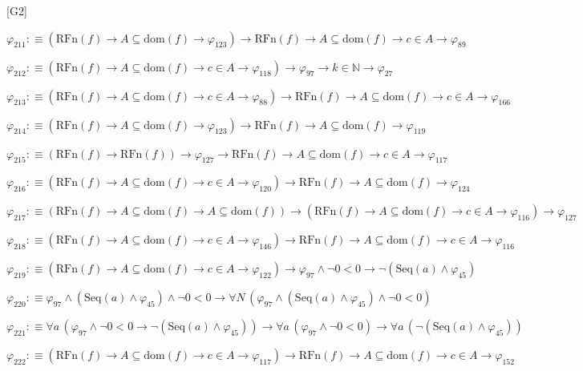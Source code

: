 \begin{fullproof}{[G2]}
\begin{abbrevlist}
\item $\varphi_{211} :\equiv (\mathrm{RFn}(f) \to A \subseteq \mathrm{dom}(f) \to \varphi_{123}) \to \mathrm{RFn}(f) \to A \subseteq \mathrm{dom}(f) \to c \in A \to \varphi_{89}$
\item $\varphi_{212} :\equiv (\mathrm{RFn}(f) \to A \subseteq \mathrm{dom}(f) \to c \in A \to \varphi_{118}) \to \varphi_{97} \to k \in \mathbb{N} \to \varphi_{27}$
\item $\varphi_{213} :\equiv (\mathrm{RFn}(f) \to A \subseteq \mathrm{dom}(f) \to c \in A \to \varphi_{88}) \to \mathrm{RFn}(f) \to A \subseteq \mathrm{dom}(f) \to c \in A \to \varphi_{166}$
\item $\varphi_{214} :\equiv (\mathrm{RFn}(f) \to A \subseteq \mathrm{dom}(f) \to \varphi_{123}) \to \mathrm{RFn}(f) \to A \subseteq \mathrm{dom}(f) \to \varphi_{119}$
\item $\varphi_{215} :\equiv (\mathrm{RFn}(f) \to \mathrm{RFn}(f)) \to \varphi_{127} \to \mathrm{RFn}(f) \to A \subseteq \mathrm{dom}(f) \to c \in A \to \varphi_{117}$
\item $\varphi_{216} :\equiv (\mathrm{RFn}(f) \to A \subseteq \mathrm{dom}(f) \to c \in A \to \varphi_{120}) \to \mathrm{RFn}(f) \to A \subseteq \mathrm{dom}(f) \to \varphi_{124}$
\item $\varphi_{217} :\equiv (\mathrm{RFn}(f) \to A \subseteq \mathrm{dom}(f) \to A \subseteq \mathrm{dom}(f)) \to (\mathrm{RFn}(f) \to A \subseteq \mathrm{dom}(f) \to c \in A \to \varphi_{116}) \to \varphi_{127}$
\item $\varphi_{218} :\equiv (\mathrm{RFn}(f) \to A \subseteq \mathrm{dom}(f) \to c \in A \to \varphi_{146}) \to \mathrm{RFn}(f) \to A \subseteq \mathrm{dom}(f) \to c \in A \to \varphi_{116}$
\item $\varphi_{219} :\equiv (\mathrm{RFn}(f) \to A \subseteq \mathrm{dom}(f) \to c \in A \to \varphi_{122}) \to \varphi_{97} \land \neg 0 < 0 \to \neg (\mathrm{Seq}(a) \land \varphi_{45})$
\item $\varphi_{220} :\equiv \varphi_{97} \land (\mathrm{Seq}(a) \land \varphi_{45}) \land \neg 0 < 0 \to \forall N\,(\varphi_{97} \land (\mathrm{Seq}(a) \land \varphi_{45}) \land \neg 0 < 0)$
\item $\varphi_{221} :\equiv \forall a\,(\varphi_{97} \land \neg 0 < 0 \to \neg (\mathrm{Seq}(a) \land \varphi_{45})) \to \forall a\,(\varphi_{97} \land \neg 0 < 0) \to \forall a\,(\neg (\mathrm{Seq}(a) \land \varphi_{45}))$
\item $\varphi_{222} :\equiv (\mathrm{RFn}(f) \to A \subseteq \mathrm{dom}(f) \to c \in A \to \varphi_{117}) \to \mathrm{RFn}(f) \to A \subseteq \mathrm{dom}(f) \to c \in A \to \varphi_{152}$

\end{abbrevlist}
\end{fullproof}

